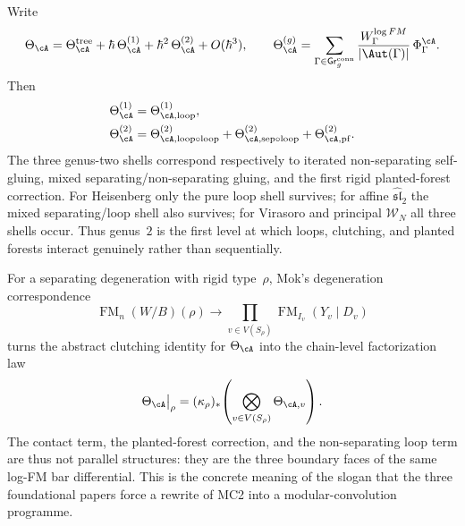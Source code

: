 \begin{computation}
\label{comp:first-stable-graph-shells}
Write
\[
\Theta_\cA
=
\Theta_\cA^{\mathrm{tree}}
+\hbar\,\Theta_\cA^{(1)}
+\hbar^2\,\Theta_\cA^{(2)}
+O(\hbar^3),
\qquad
\Theta_\cA^{(g)}
=
\sum_{\Gamma\in \mathsf{Gr}^{\mathrm{conn}}_g}
\frac{W^{\log FM}_\Gamma}{|\Aut(\Gamma)|}\,\Phi^\cA_\Gamma.
\]
Then
\begin{align*}
\Theta_\cA^{(1)}
&=
\Theta_{\cA,\mathrm{loop}}^{(1)},\\
\Theta_\cA^{(2)}
&=
\Theta_{\cA,\mathrm{loop}\circ\mathrm{loop}}^{(2)}
+\Theta_{\cA,\mathrm{sep}\circ\mathrm{loop}}^{(2)}
+\Theta_{\cA,\mathrm{pf}}^{(2)}.
\end{align*}
The three genus-two shells correspond respectively to iterated
non-separating self-gluing, mixed separating/non-separating gluing,
and the first rigid planted-forest correction.  For Heisenberg only the
pure loop shell survives; for affine $\widehat{\mathfrak{sl}}_2$ the
mixed separating/loop shell also survives; for Virasoro and principal
$\mathcal W_N$ all three shells occur.  Thus genus~$2$ is the first
level at which loops, clutching, and planted forests interact genuinely
rather than sequentially.
\end{computation}

\begin{remark}
\label{rem:rigid-type-boundary-factorization}
For a separating degeneration with rigid type~$\rho$, Mok's degeneration
correspondence
\[
\operatorname{FM}_n(W/B)(\rho)\longrightarrow
\prod_{v\in V(S_\rho)}
\operatorname{FM}_{I_v}(Y_v\mathbin{|}D_v)
\]
turns the abstract clutching identity for $\Theta_\cA$ into the chain-level
factorization law
\[
\Theta_\cA\big|_{\rho}
=
(\kappa_\rho)_*\!\left(
\bigotimes_{v\in V(S_\rho)}\Theta_{\cA,v}
\right).
\]
The contact term, the planted-forest correction, and the non-separating loop
term are thus not parallel structures: they are the three boundary faces of the
same log-FM bar differential.  This is the concrete meaning of the slogan that
the three foundational papers force a rewrite of MC2 into a modular-convolution
programme.
\end{remark}


